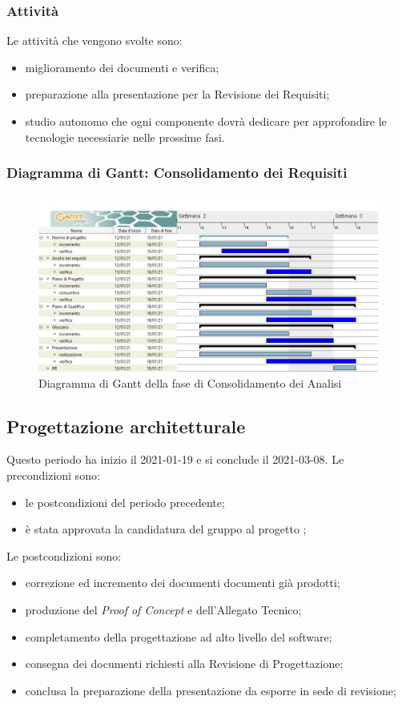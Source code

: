\subsubsection{Attività}
Le attività che vengono svolte sono:
\begin{itemize}
	\item miglioramento dei documenti e verifica;
	\item preparazione alla presentazione per la Revisione dei Requisiti;
	\item studio autonomo che ogni componente dovrà dedicare per approfondire le tecnologie necessiarie nelle prossime fasi.
\end{itemize}
\subsubsection{Diagramma di Gantt: Consolidamento dei Requisiti}
\begin{figure}[H]
    \centering
    \includegraphics[scale = 0.4]{components/img/consolidamento_requisiti.jpg}
    \caption{Diagramma di Gantt della fase di Consolidamento dei Analisi}
    \label{fig:Diagramma}
\end{figure}

\newpage
\subsection{Progettazione architetturale}
Questo periodo ha inizio il 2021-01-19 e si conclude il 2021-03-08.
Le precondizioni sono:
\begin{itemize}
	\item le postcondizioni del periodo precedente;
	\item è stata approvata la candidatura del gruppo al progetto \NomeProgetto;
\end{itemize}
Le postcondizioni sono:
\begin{itemize}
	\item correzione ed incremento dei documenti documenti già prodotti;
	\item produzione del \textit{Proof of Concept} e dell'Allegato Tecnico;
	\item completamento della progettazione ad alto livello del software;
	\item consegna dei documenti richiesti alla Revisione di Progettazione; 	
	\item conclusa la preparazione della presentazione da esporre in sede di revisione;
\end{itemize}

